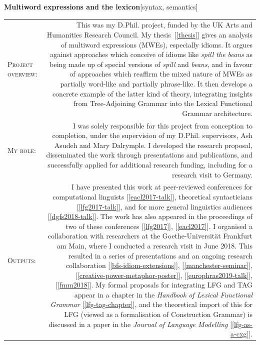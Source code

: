 \documentclass[11pt,a4paper]{article}
\makeatletter
\newlength{\rulelength}%
\newcommand{\REx}[2]{%
\vspace*{0.1\baselineskip}%
{\large\textbf{#1}\hfill\textnormal{[#2]}}%
\vspace*{0.5\baselineskip}%
}
\newenvironment{cvsection}{%
  \setlength{\extrarowheight}{0.70ex}
  \begin{longtable}[l]{@{} L R @{}}
}{%
  \end{longtable}
}
\newcommand{\sref}[1]{[\ref{#1}]}
\newcommand{\researchsubhead}[1]{%
\textsc{#1}:%
}
\newcommand{\cvheading}[1]{\noindent{{\color{headercolor}\rule[0.4ex]{\rulelength}{2pt}\hspace*{9pt} \Large #1}}\vspace*{0.5\baselineskip}}
\makeatother
\begin{document}
\REx{Multiword expressions and the lexicon}{syntax, semantics}
\begin{cvsection}
  \researchsubhead{Project overview} &%
  This was my D.Phil. project, funded by the UK Arts and Humanities Research
  Council. My thesis~\sref{thesis} gives an analysis of multiword expressions
  (MWEs), especially idioms. It argues against approaches which conceive of
  idioms like \emph{spill the beans} as being made up of special versions of
  \emph{spill} and \emph{beans}, and in favour of approaches which reaffirm the
  mixed nature of MWEs as partially word-like and partially phrase-like. It then
  develops a concrete example of the latter kind of theory, integrating insights
  from Tree-Adjoining Grammar into the Lexical Functional Grammar architecture.%
  \\
  \researchsubhead{My role} &%
  I was solely responsible for this project from conception to completion, under
  the supervision of my D.Phil. supervisors, Ash Asudeh and Mary Dalrymple. I
  developed the research proposal, disseminated the work through presentations
  and publications, and successfully applied for additional research funding,
  including for a research visit to Germany.
  \\
  \researchsubhead{Outputs} &%
  I have presented this work at peer-reviewed conferences for computational
  linguists \sref{eacl2017-talk}, theoretical syntacticians \sref{lfg2017-talk},
  and for more general linguistics audiences \sref{dgfs2018-talk}. The work has
  also appeared in the proceedings of two of these conferences \sref{lfg2017},
  \sref{eacl2017}. I organised a collaboration with researchers at the
  Goethe-Universit\"{a}t Frankfurt am Main, where I conducted a research visit
  in June 2018. This resulted in a series of presentations and an ongoing
  research collaboration \sref{bfs-idiom-extensions}, \sref{manchester-seminar},
  \sref{creative-power-metaphor-poster}, \sref{europhras2019-talk},
  \sref{fmm2018}. My formal proposals for integrating LFG and TAG appear in a
  chapter in the \textit{Handbook of Lexical Functional Grammar}
  \sref{lfg-tag-chapter}, and the theoretical import of this for LFG (viewed as
  a formalisation of Construction Grammar) is discussed in a paper in the
  \textit{Journal of Language Modelling} \sref{lfg-as-a-cxg}.
\end{cvsection}

\newpage

\cvheading{Teaching}
\end{document}
